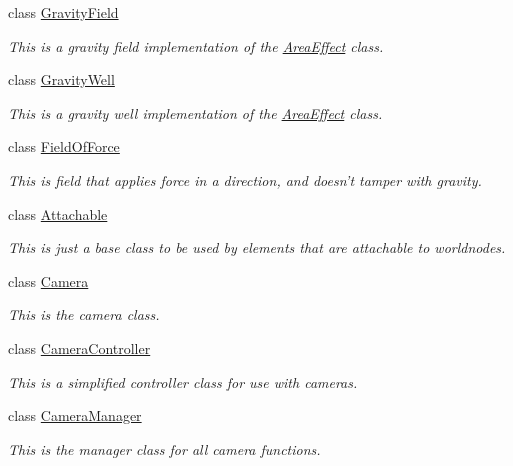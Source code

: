 \begin{DoxyCompactItemize}
class \hyperlink{classphys_1_1GravityField}{GravityField}
\begin{DoxyCompactList}\small\item\em This is a gravity field implementation of the \hyperlink{classphys_1_1AreaEffect}{AreaEffect} class. \item\end{DoxyCompactList}\item 
class \hyperlink{classphys_1_1GravityWell}{GravityWell}
\begin{DoxyCompactList}\small\item\em This is a gravity well implementation of the \hyperlink{classphys_1_1AreaEffect}{AreaEffect} class. \item\end{DoxyCompactList}\item 
class \hyperlink{classphys_1_1FieldOfForce}{FieldOfForce}
\begin{DoxyCompactList}\small\item\em This is field that applies force in a direction, and doesn't tamper with gravity. \item\end{DoxyCompactList}\item 
class \hyperlink{classphys_1_1Attachable}{Attachable}
\begin{DoxyCompactList}\small\item\em This is just a base class to be used by elements that are attachable to worldnodes. \item\end{DoxyCompactList}\item 
class \hyperlink{classphys_1_1Camera}{Camera}
\begin{DoxyCompactList}\small\item\em This is the camera class. \item\end{DoxyCompactList}\item 
class \hyperlink{classphys_1_1CameraController}{CameraController}
\begin{DoxyCompactList}\small\item\em This is a simplified controller class for use with cameras. \item\end{DoxyCompactList}\item 
class \hyperlink{classphys_1_1CameraManager}{CameraManager}
\begin{DoxyCompactList}\small\item\em This is the manager class for all camera functions. \item\end{DoxyCompactList}\item 

\end{DoxyCompactItemize}
